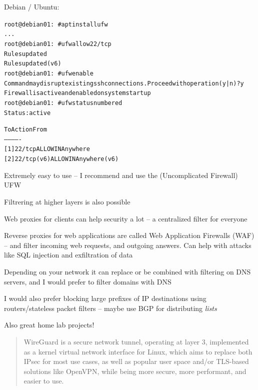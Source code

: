 \documentclass[Screen16to9,17pt]{foils}
\begin{document}

Debian / Ubuntu:
\begin{alltt}\scriptsize
root@debian01:~# apt install ufw
...
root@debian01:~# ufw allow 22/tcp
Rules updated
Rules updated (v6)
root@debian01:~# ufw enable
Command may disrupt existing ssh connections. Proceed with operation (y|n)? y
Firewall is active and enabled on system startup
root@debian01:~# ufw status numbered
Status: active

     To                         Action      From
     --                         ------      ----
[ 1] 22/tcp                     ALLOW IN    Anywhere
[ 2] 22/tcp (v6)                ALLOW IN    Anywhere (v6)
\end{alltt}

\begin{list2}
\item Extremely easy to use -- I recommend and use the (Uncomplicated Firewall) UFW
\end{list2}


\begin{list2}
\item Filtrering at higher layers is also possible
\item Web proxies for clients can help security a lot -- a centralized filter for everyone

\item Reverse proxies for web applications are called
Web Application Firewalls (WAF) -- and filter incoming web requests, and outgoing answers. Can help with attacks like SQL injection and exfiltration of data
\item Depending on your network it can replace or be combined with filtering on DNS servers, and I would prefer to filter domains with DNS
\item I would also prefer blocking large prefixes of IP destinations using routers/stateless packet filters -- maybe use BGP for distributing \emph{lists}
\end{list2}

Also great home lab projects!


\begin{quote}\small
WireGuard is a secure network tunnel, operating at layer 3, implemented as a kernel virtual network interface for Linux, which aims to replace both IPsec for most use cases, as well as popular user space and/or TLS-based solutions like OpenVPN, while being more secure, more performant, and easier to use.
\end{quote}
\end{document}
